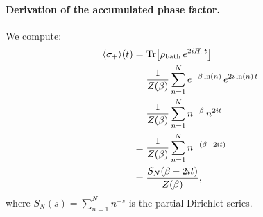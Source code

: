 \paragraph{Derivation of the accumulated phase factor.}
We compute:
\begin{align}\label{eq:coherence-deriv}
  \langle\sigma_+\rangle(t)
  &= \operatorname{Tr}\bigl[\rho_{\mathrm{bath}}\,e^{2iH_0 t}\bigr] \nonumber\\
  &= \frac{1}{Z(\beta)} \sum_{n=1}^{N} e^{-\beta\ln(n)}\,e^{2i\ln(n)\,t} \nonumber\\
  &= \frac{1}{Z(\beta)} \sum_{n=1}^{N} n^{-\beta}\,n^{2it} \nonumber\\
  &= \frac{1}{Z(\beta)} \sum_{n=1}^{N} n^{-(\beta - 2it)} \nonumber\\
  &= \frac{S_N(\beta - 2it)}{Z(\beta)},
\end{align}
where $S_N(s) = \sum_{n=1}^{N} n^{-s}$ is the partial Dirichlet series.

